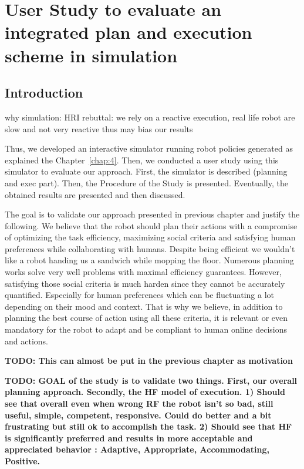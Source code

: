 \ifdefined{}
\else
\setcounter{chapter}{4} 
\dominitoc
\faketableofcontents
\fi

\chapter{User Study to evaluate an integrated plan and execution scheme in simulation}
\label{chap:5}
\minitoc

\section{Introduction}

why simulation: HRI rebuttal: we rely on a reactive execution, real life robot are slow and not very reactive thus may bias our results

Thus, we developed an interactive simulator running robot policies generated as explained the Chapter~\ref{chap:4}. Then, we conducted a user study using this simulator to evaluate our approach.
First, the simulator is described (planning and exec part). Then, the Procedure of the Study is presented. Eventually, the obtained results are presented and then discussed.

The goal is to validate our approach presented in previous chapter and justify the following. We believe that the robot should plan their actions with a compromise of optimizing the task efficiency, maximizing social criteria and satisfying human preferences while collaborating with humans. Despite being efficient we wouldn't like a robot handing us a sandwich while mopping the floor. Numerous planning works solve very well problems with maximal efficiency guarantees. However, satisfying those social criteria is much harden since they cannot be accurately quantified. Especially for human preferences which can be fluctuating a lot depending on their mood and context. That is why we believe, in addition to planning the best course of action using all these criteria, it is relevant or even mandatory for the robot to adapt and be compliant to human online decisions and actions. 

\textbf{TODO: This can almost be put in the previous chapter as motivation}

\textbf{TODO: GOAL of the study is to validate two things. First, our overall planning approach. Secondly, the HF model of execution. 1) Should see that overall even when wrong RF the robot isn't so bad, still useful, simple, competent, responsive. Could do better and a bit frustrating but still ok to accomplish the task. 2) Should see that HF is significantly preferred and results in more acceptable and appreciated behavior : Adaptive, Appropriate, Accommodating, Positive.}

